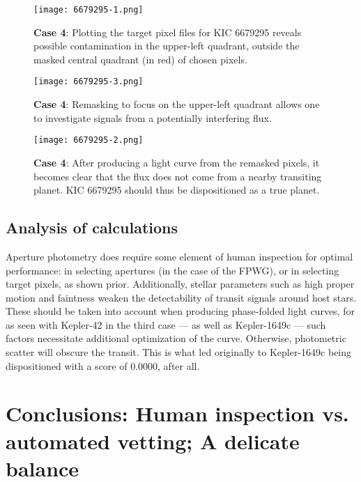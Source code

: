 \documentclass[onecolumn, 12pt]{article}
\begin{document}
\begin{figure}[p]
\centering
\texttt{[image: 6679295-1.png]}
\caption{\textbf{Case 4}: Plotting the target pixel files for KIC 6679295 reveals possible contamination in the upper-left quadrant, outside the masked central quadrant (in red) of chosen pixels.}
\end{figure}

\begin{figure}[p]
\centering
\texttt{[image: 6679295-3.png]}
\caption{\textbf{Case 4}: Remasking to focus on the upper-left quadrant allows one to investigate signals from a potentially interfering flux.}
\end{figure}

\begin{figure}[t]
\centering
\texttt{[image: 6679295-2.png]}
\caption{\textbf{Case 4}: After producing a light curve from the remasked pixels, it becomes clear that the flux does not come from a nearby transiting planet. KIC 6679295 should thus be dispositioned as a true planet.}
\end{figure}

\subsection{Analysis of calculations}

Aperture photometry does require some element of human inspection for optimal performance: in selecting apertures (in the case of the FPWG), or in selecting target pixels, as shown prior. Additionally, stellar parameters such as high proper motion and faintness weaken the detectability of transit signals around host stars. These should be taken into account when producing phase-folded light curves, for as seen with Kepler-42 in the third case — as well as Kepler-1649c — such factors necessitate additional optimization of the curve. Otherwise, photometric scatter will obscure the transit. This is what led originally to Kepler-1649c being dispositioned with a score of 0.0000, after all.

\section{Conclusions: Human inspection vs. automated vetting; A delicate balance}
\end{document}

